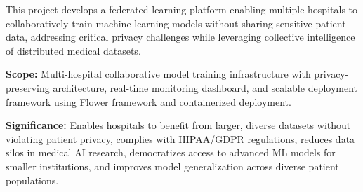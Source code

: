 This project develops a federated learning platform enabling multiple hospitals to collaboratively train machine learning models without sharing sensitive patient data, addressing critical privacy challenges while leveraging collective intelligence of distributed medical datasets.

\textbf{Scope:} Multi-hospital collaborative model training infrastructure with privacy-preserving architecture, real-time monitoring dashboard, and scalable deployment framework using Flower framework and containerized deployment.

\textbf{Significance:} Enables hospitals to benefit from larger, diverse datasets without violating patient privacy, complies with HIPAA/GDPR regulations, reduces data silos in medical AI research, democratizes access to advanced ML models for smaller institutions, and improves model generalization across diverse patient populations.
